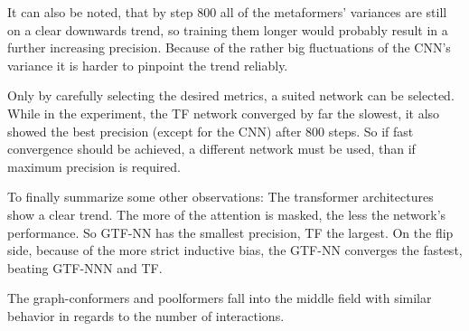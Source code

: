It can also be noted, that by step 800 all of the metaformers' variances are still on a clear downwards trend, so training them longer would probably result in a further increasing precision.
Because of the rather big fluctuations of the CNN's variance it is harder to pinpoint the trend reliably.

Only by carefully selecting the desired metrics, a suited network can be selected. 
While in the experiment, the TF network converged by far the slowest, it also showed the best precision (except for the CNN) after 800 steps. 
So if fast convergence should be achieved, a different network must be used, than if maximum precision is required.

To finally summarize some other observations: The transformer architectures show a clear trend. 
The more of the attention is masked, the less the network's performance. 
So GTF-NN has the smallest precision, TF the largest. On the flip side, because of the more strict inductive bias, the GTF-NN converges the fastest, beating GTF-NNN and TF.

The graph-conformers and poolformers fall into the middle field with similar behavior in regards to the number of interactions.

